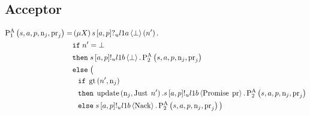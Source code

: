 \subsection{Acceptor}
\begin{align*}
\operatorname{P^{A}_{1}}\left(
    s,
    a,
    p,
    \operatorname{n}_{j},
    \operatorname{pr}_{j}
\right) =
&
    \left(\mu X\right)
    s\left[a, p\right]?_u l1a \left\langle \bot \right\rangle \left(n'\right).
    \\
&
    \mathtt{if}\; n' = \bot
    \\
&
    \mathtt{then}\;
        s\left[a, p\right]!_u l1b \left\langle \bot \right\rangle.
        \operatorname{P^{A}_{2}}\left(
            s,
            a,
            p,
            \operatorname{n}_{j},
            \operatorname{pr}_{j}
        \right)
    \\
&
    \mathtt{else}\; \big(\\
&\hspace*{0.75em * 1}
    \mathtt{if}\; \operatorname{gt}\left(n', \operatorname{n}_{j}\right)
    \\
&\hspace*{0.75em * 1}
    \mathtt{then}\;
        \operatorname{update} \left(\operatorname{n}_{j}, \operatorname{Just}\; n'\right).
        s\left[a, p\right]!_u l1b \left\langle \operatorname{Promise}\; \operatorname{pr} \right\rangle.
        \operatorname{P^{A}_{2}}\left(
            s,
            a,
            p,
            \operatorname{n}_{j},
            \operatorname{pr}_{j}
        \right)
        \\
&\hspace*{0.75em * 1}
    \mathtt{else}\;
        s\left[a, p\right]!_u l1b \left\langle \operatorname{Nack} \right\rangle.
        \operatorname{P^{A}_{2}}\left(
            s,
            a,
            p,
            \operatorname{n}_{j},
            \operatorname{pr}_{j}
        \right)
\big )
\end{align*}

